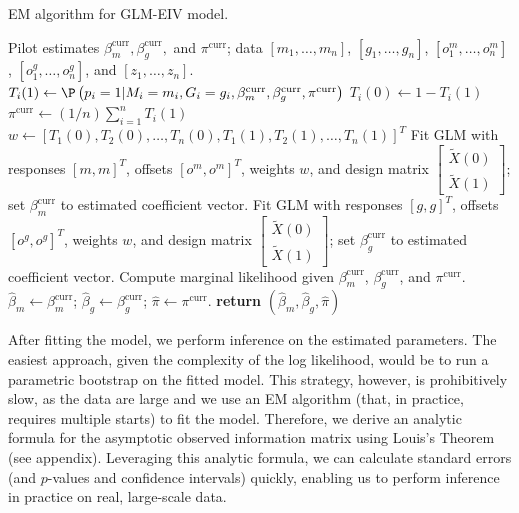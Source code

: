 \documentclass[12pt]{article}
\begin{document}
\begin{algorithm}
	\caption{EM algorithm for GLM-EIV model.}\label{algo:em_full}
	\begin{algorithmic}
		\Require Pilot estimates $\beta^\textrm{curr}_m, \beta^\textrm{curr}_g,$ and $\pi^\textrm{curr}$; data $[m_1, \dots, m_n]$, $[g_1, \dots, g_n]$, $[o^m_1, \dots, o^m_n]$, $[o^g_1, \dots, o^g_n]$, and $[z_1, \dots, z_n]$.
			 
			\State $T_i(1) \gets \P\left(p_i = 1 |M_i = m_i, G_i = g_i, \beta_m^\textrm{curr}, \beta_g^\textrm{curr}, \pi^\textrm{curr} \right)$
			\State $T_i(0) \gets 1 - T_i(1)$
		 \EndFor
		 \State $\pi^{\textrm{curr}} \gets (1/n) \sum_{i=1}^n T_i(1)$ 
		 \State $w \gets [T_1(0), T_2(0), \dots, T_n(0), T_1(1), T_2(1), \dots, T_n(1)]^T$
		 \State Fit GLM with responses $[m,m]^T$, offsets $[o^m, o^m]^T$, weights $w$, and design matrix $\begin{bmatrix} \tilde{X}(0) \\ \tilde{X}(1) \end{bmatrix}$; set $\beta_m^\textrm{curr}$ to estimated coefficient vector.
		\State Fit GLM with responses  $[g,g]^T$, offsets $[o^g, o^g]^T$, weights $w$, and design matrix $\begin{bmatrix} \tilde{X}(0) \\ \tilde{X}(1) \end{bmatrix}$; set $\beta_g^\textrm{curr}$ to estimated coefficient vector.
		\State Compute marginal likelihood given $\beta_m^\textrm{curr}$, $\beta_g^\textrm{curr}$, and $\pi^\textrm{curr}$.
		\EndWhile
		\State $\hat{\beta}_m \gets \beta_m^\textrm{curr}$; $\hat{\beta}_g \gets \beta_g^\textrm{curr}$; $\hat{\pi} \gets \pi^\textrm{curr}$.
		\State \textbf{return} $(\hat{\beta}_m, \hat{\beta}_g, \hat{\pi})$
	\end{algorithmic}
\end{algorithm}

After fitting the model, we perform inference on the estimated parameters. The easiest approach, given the complexity of the log likelihood, would be to run a parametric bootstrap on the fitted model. This strategy, however, is prohibitively slow, as the data are large and we use an EM algorithm (that, in practice, requires multiple starts) to fit the model. Therefore, we derive an analytic formula for the asymptotic observed information matrix using Louis's Theorem \cite{Louis2012} (see appendix). Leveraging this analytic formula, we can calculate standard errors (and $p$-values and confidence intervals) quickly, enabling us to perform inference in practice on real, large-scale data.
\end{document}
